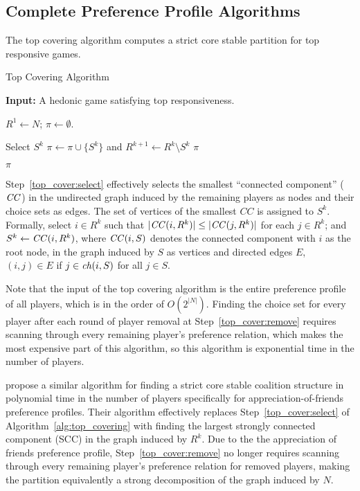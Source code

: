 \subsection{Complete Preference Profile Algorithms} \label{subsec:full_pref_algos}
The top covering algorithm computes a strict core stable partition for top responsive games.

\begin{algorithm}[htb]
  \caption{Top Covering Algorithm}
  \label{alg:top_covering}
  \textbf{Input:} A hedonic game satisfying top responsiveness.

  \begin{algorithmic}[1]
  \State $R^1 \leftarrow N$; $\pi \leftarrow \emptyset$.

    \State \label{top_cover:select} Select $S^k$
    \State \label{top_cover:remove} $\pi \leftarrow \pi \cup \lbrace S^k \rbrace$ and $R^{k+1} \leftarrow  R^k \setminus S^k$
      \State \Return $\pi$
    \EndIf
  \EndFor

  \State \Return $\pi$
 \end{algorithmic}
\end{algorithm}

Step~\ref{top_cover:select} effectively selects the smallest ``connected component'' ($\mathit{CC}$) in the undirected graph induced by the remaining players as nodes and their choice sets as edges. The set of vertices of the smallest $CC$ is assigned to $S^k$. Formally, select $i\in R^k$ such that $|\mathit{CC}(i,R^k)| \leq |\mathit{CC}(j,R^k)|$ for each $j\in R^k$; and $S^k\leftarrow \mathit{CC}(i,R^k)$, where $\mathit{CC}(i, S)$ denotes the connected component with $i$ as the root node, in the graph induced by $S$ as vertices and directed edges $E$, $(i, j) \in E$ if $j \in \mathit{ch}(i, S)$ for all $j \in S$.

Note that the input of the top covering algorithm is the entire preference profile of all players, which is in the order of $O(2^{|N|})$. Finding the choice set for every player after each round of player removal at Step~\ref{top_cover:remove} requires scanning through every remaining player's preference relation, which makes the most expensive part of this algorithm, so this algorithm is exponential time in the number of players.

 propose a similar algorithm for finding a strict core stable coalition structure in polynomial time in the number of players specifically for appreciation-of-friends preference profiles. Their algorithm effectively replaces Step~\ref{top_cover:select} of Algorithm~\ref{alg:top_covering} with finding the largest strongly connected component (SCC) in the graph induced by $R^k$. Due to the the appreciation of friends preference profile, Step~\ref{top_cover:remove} no longer requires scanning through every remaining player's preference relation for removed players, making the partition equivalently a strong decomposition of the graph induced by $N$.

